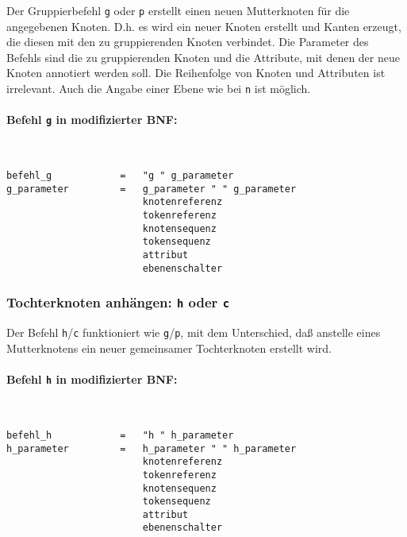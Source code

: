 \documentclass[12pt]{scrartcl}
\begin{document}
Der Gruppierbefehl \texttt{g} oder \texttt{p} erstellt einen neuen Mutterknoten für die angegebenen Knoten. D.h. es wird ein neuer Knoten erstellt und Kanten erzeugt, die diesen mit den zu gruppierenden Knoten verbindet. Die Parameter des Befehls sind die zu gruppierenden Knoten und die Attribute, mit denen der neue Knoten annotiert werden soll. Die Reihenfolge von Knoten und Attributen ist irrelevant. Auch die Angabe einer Ebene wie bei \texttt{n} ist möglich.
\paragraph*{Befehl \texttt{g} in modifizierter BNF:}
~
\begin{framed}
\begin{lstlisting}
befehl_g            =   "g " g_parameter
g_parameter         =   g_parameter " " g_parameter
                        knotenreferenz
                        tokenreferenz
                        knotensequenz
                        tokensequenz
                        attribut
                        ebenenschalter
\end{lstlisting}
\end{framed}


\subsubsection{Tochterknoten anhängen: \texttt{h} oder \texttt{c}}

Der Befehl \texttt{h}/\texttt{c} funktioniert wie \texttt{g}/\texttt{p}, mit dem Unterschied, daß anstelle eines Mutterknotens ein neuer gemeinsamer Tochterknoten erstellt wird.
\paragraph*{Befehl \texttt{h} in modifizierter BNF:}
~
\begin{framed}
\begin{lstlisting}
befehl_h            =   "h " h_parameter
h_parameter         =   h_parameter " " h_parameter
                        knotenreferenz
                        tokenreferenz
                        knotensequenz
                        tokensequenz
                        attribut
                        ebenenschalter
\end{lstlisting}
\end{framed}
\end{document}
